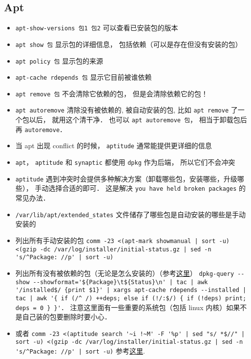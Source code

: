 
\begin{issues}
\issueDraft
\end{issues}

\subsection{Apt}
\begin{itemize}
\item \verb|apt-show-versions 包1 包2| 可以查看已安装包的版本
\item \verb|apt show 包| 显示包的详细信息， 包括依赖（可以是存在但没有安装的包）
\item \verb|apt policy 包| 显示包的来源
\item \verb|apt-cache rdepends 包| 显示它目前被谁依赖
\item \verb|apt remove 包| 不会清除它依赖的包， 但是会清除依赖它的包！
\item \verb|apt autoremove| 清除没有被依赖的, 被自动安装的包, 比如 \verb|apt remove| 了一个包以后， 就用这个清干净． 也可以 \verb|apt autoremove 包|， 相当于卸载包后再 \verb|autoremove|．
\item 当 apt 出现 conflict 的时候， \verb|aptitude| 通常能提供更详细的信息
\item \verb|apt|， \verb|aptitude| 和 \verb|synaptic| 都使用 \verb|dpkg| 作为后端， 所以它们不会冲突
\item \verb|aptitude| 遇到冲突时会提供多种解决方案（卸载哪些包，安装哪些，升级哪些）， 手动选择合适的即可． 这是解决 \verb|you have held broken packages| 的常见办法．
\item \verb|/var/lib/apt/extended_states| 文件储存了哪些包是自动安装的哪些是手动安装的
\item 列出所有手动安装的包 \verb`comm -23 <(apt-mark showmanual | sort -u) <(gzip -dc /var/log/installer/initial-status.gz | sed -n 's/^Package: //p' | sort -u)`
\item 列出所有没有被依赖的包（无论是怎么安装的）（参考\href{https://askubuntu.com/questions/1114733/how-do-i-list-all-packages-that-no-package-depends-on}{这里}） \verb`dpkg-query --show --showformat='${Package}\t${Status}\n' | tac | awk '/installed$/ {print $1}' | xargs apt-cache rdepends --installed | tac | awk '{ if (/^ /) ++deps; else if (!/:$/) { if (!deps) print; deps = 0 } }'`． 注意这里面有一些重要的系统包（包括 linux 内核）如果不是自己装的包要删除时要小心．
\item 或者 \verb`comm -23 <(aptitude search '~i !~M' -F '%p' | sed "s/ *$//" | sort -u) <(gzip -dc /var/log/installer/initial-status.gz | sed -n 's/^Package: //p' | sort -u)` 参考\href{https://askubuntu.com/questions/2389/how-to-list-manually-installed-packages}{这里}.

\end{itemize}
